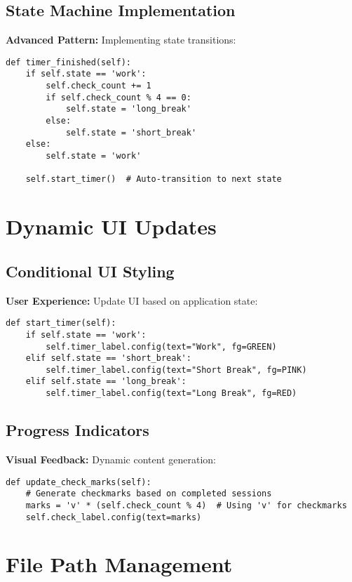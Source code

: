 \documentclass[12pt]{article}
\begin{document}
\subsection{State Machine Implementation}
\textbf{Advanced Pattern:} Implementing state transitions:

\begin{lstlisting}
def timer_finished(self):
    if self.state == 'work':
        self.check_count += 1
        if self.check_count % 4 == 0:
            self.state = 'long_break'
        else:
            self.state = 'short_break'
    else:
        self.state = 'work'
    
    self.start_timer()  # Auto-transition to next state
\end{lstlisting}

\section{Dynamic UI Updates}

\subsection{Conditional UI Styling}
\textbf{User Experience:} Update UI based on application state:

\begin{lstlisting}
def start_timer(self):
    if self.state == 'work':
        self.timer_label.config(text="Work", fg=GREEN)
    elif self.state == 'short_break':
        self.timer_label.config(text="Short Break", fg=PINK)
    elif self.state == 'long_break':
        self.timer_label.config(text="Long Break", fg=RED)
\end{lstlisting}

\subsection{Progress Indicators}
\textbf{Visual Feedback:} Dynamic content generation:

\begin{lstlisting}
def update_check_marks(self):
    # Generate checkmarks based on completed sessions
    marks = 'v' * (self.check_count % 4)  # Using 'v' for checkmarks
    self.check_label.config(text=marks)
\end{lstlisting}

\section{File Path Management}
\end{document}
